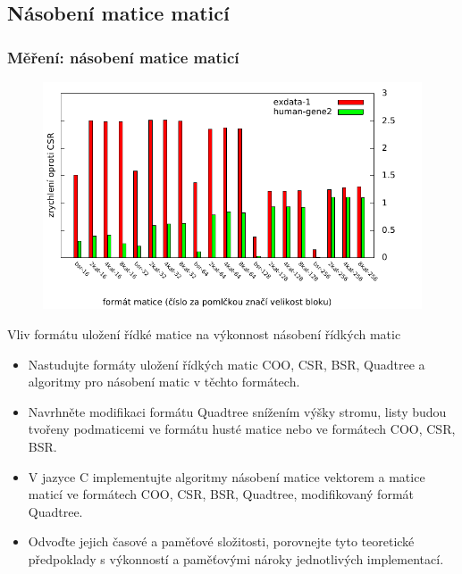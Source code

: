 \documentclass{beamer}
\begin{document}
\subsection{Násobení matice maticí}
\begin{frame}
	\frametitle{Měření: násobení matice maticí}
	
	\begin{figure}
		\centering
		\includegraphics[width=1.0\textwidth]{./images/mmms2}
	\end{figure}	
\end{frame}


\begin{frame}
	\begin{exampleblock}{Vliv formátu uložení řídké matice na výkonnost násobení řídkých matic}
		\begin{itemize}
			\item[\checkmark] Nastudujte formáty uložení řídkých matic COO, CSR, BSR, Quadtree a algoritmy pro násobení matic v těchto formátech.
			\item[\checkmark] Navrhněte modifikaci formátu Quadtree snížením výšky stromu, listy budou tvořeny podmaticemi ve formátu husté matice nebo ve formátech COO, CSR, BSR.
			\item[\checkmark] V jazyce C implementujte algoritmy násobení matice vektorem a matice maticí ve formátech COO, CSR, BSR, Quadtree, modifikovaný formát Quadtree.
			\item[\checkmark] Odvoďte jejich časové a paměťové složitosti, porovnejte tyto teoretické předpoklady s výkonností a paměťovými nároky jednotlivých implementací.
		\end{itemize}
	\end{exampleblock}
\end{frame}
\end{document}
